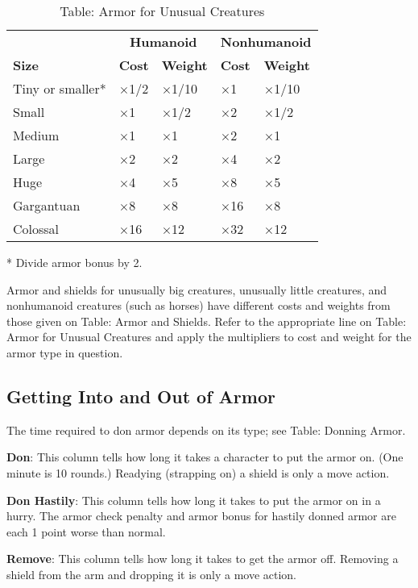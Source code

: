 \begin{table}[]
\sffamily
\caption{Table: Armor for Unusual Creatures}
\begin{tabular}{lllll}
  & \multicolumn{2}{c}{\textbf{Humanoid}} & \multicolumn{2}{c}{\textbf{Nonhumanoid}}\\
\textbf{Size} & \textbf{Cost} & \textbf{Weight} & \textbf{Cost} & \textbf{Weight}\\
Tiny or smaller*& $\times$1/2& $\times$1/10& $\times$1& $\times$1/10 \\
 Small& $\times$1& $\times$1/2& $\times$2& $\times$1/2 \\
 Medium& $\times$1& $\times$1& $\times$2& $\times$1 \\
 Large& $\times$2& $\times$2& $\times$4& $\times$2 \\
 Huge& $\times$4& $\times$5& $\times$8& $\times$5 \\
 Gargantuan& $\times$8& $\times$8& $\times$16& $\times$8 \\
 Colossal& $\times$16& $\times$12& $\times$32& $\times$12\\
\end{tabular}
* Divide armor bonus by 2.\\
\end{table}
Armor and shields for unusually big creatures, unusually little creatures, and nonhumanoid creatures (such as horses) have different costs and weights from those given on Table: Armor and Shields. Refer to the appropriate line on Table: Armor for Unusual Creatures and apply the multipliers to cost and weight for the armor type in question.

\subsection{Getting Into and Out of Armor}

		
The time required to don armor depends on its type; see Table: Donning Armor.
		
\textbf{Don}: This column tells how long it takes a character to put the armor on. (One minute is 10 rounds.) Readying (strapping on) a shield is only a move action.
		
\textbf{Don Hastily}: This column tells how long it takes to put the armor on in a hurry. The armor check penalty and armor bonus for hastily donned armor are each 1 point worse than normal. 
		
\textbf{Remove}: This column tells how long it takes to get the armor off. Removing a shield from the arm and dropping it is only a move action.

